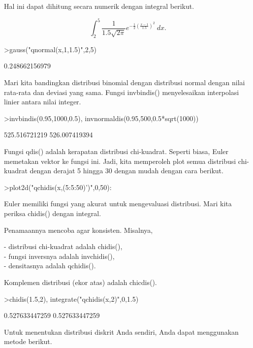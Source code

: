 \documentclass[a4paper,10pt]{article}
\begin{document}
\begin{eulernotebook}
\begin{eulercomment}
Hal ini dapat dihitung secara numerik dengan integral berikut.\\
\end{eulercomment}
\begin{eulerformula}
\[
\int_2^5 \frac{1}{1.5\sqrt{2\pi}}e^{-\frac{1}{2}(\frac{x-1}{1.5})^2}\ dx.
\]
\end{eulerformula}
\begin{eulerprompt}
>gauss("qnormal(x,1,1.5)",2,5)
\end{eulerprompt}
\begin{euleroutput}
  0.248662156979
\end{euleroutput}
\begin{eulercomment}
Mari kita bandingkan distribusi binomial dengan distribusi normal
dengan nilai rata-rata dan deviasi yang sama. Fungsi invbindis()
menyelesaikan interpolasi linier antara nilai integer.
\end{eulercomment}
\begin{eulerprompt}
>invbindis(0.95,1000,0.5), invnormaldis(0.95,500,0.5*sqrt(1000))
\end{eulerprompt}
\begin{euleroutput}
  525.516721219
  526.007419394
\end{euleroutput}
\begin{eulercomment}
Fungsi qdis() adalah kerapatan distribusi chi-kuadrat. Seperti biasa,
Euler memetakan vektor ke fungsi ini. Jadi, kita memperoleh plot semua
distribusi chi-kuadrat dengan derajat 5 hingga 30 dengan mudah dengan
cara berikut.
\end{eulercomment}
\begin{eulerprompt}
>plot2d("qchidis(x,(5:5:50)')",0,50):
\end{eulerprompt}
\begin{eulercomment}
Euler memiliki fungsi yang akurat untuk mengevaluasi distribusi. Mari
kita periksa chidis() dengan integral.

Penamaannya mencoba agar konsisten. Misalnya,

- distribusi chi-kuadrat adalah chidis(),\\
- fungsi inversnya adalah invchidis(),\\
- densitasnya adalah qchidis().

Komplemen distribusi (ekor atas) adalah chicdis().
\end{eulercomment}
\begin{eulerprompt}
>chidis(1.5,2), integrate("qchidis(x,2)",0,1.5)
\end{eulerprompt}
\begin{euleroutput}
  0.527633447259
  0.527633447259
\end{euleroutput}
\begin{eulercomment}
Untuk menentukan distribusi diskrit Anda sendiri, Anda dapat
menggunakan metode berikut.


\end{eulercomment}
\end{eulernotebook}
\end{document}

